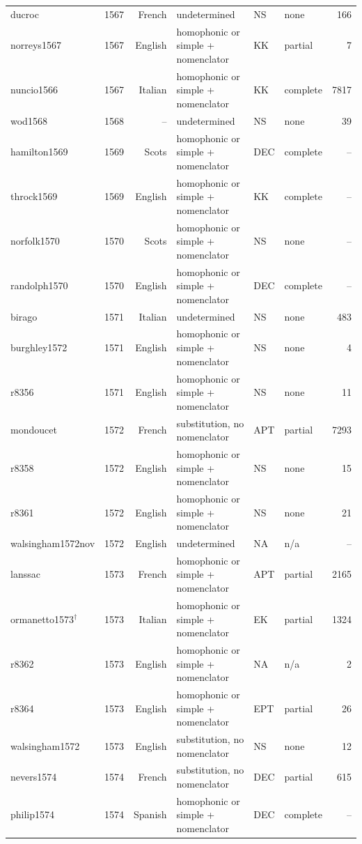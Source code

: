 {\begin{longtable}{@{}llrlllr@{}}
ducroc & 1567 & French & undetermined & NS & none & 166 \\
norreys1567 & 1567 & English & homophonic or simple + nomenclator & KK & partial & 7 \\
nuncio1566 & 1567 & Italian & homophonic or simple + nomenclator & KK & complete & 7817 \\
wod1568 & 1568 & -- & undetermined & NS & none & 39 \\
hamilton1569 & 1569 & Scots & homophonic or simple + nomenclator & DEC & complete & -- \\
throck1569 & 1569 & English & homophonic or simple + nomenclator & KK & complete & -- \\
norfolk1570 & 1570 & Scots & homophonic or simple + nomenclator & NS & none & -- \\
randolph1570 & 1570 & English & homophonic or simple + nomenclator & DEC & complete & -- \\
birago & 1571 & Italian & undetermined & NS & none & 483 \\
burghley1572 & 1571 & English & homophonic or simple + nomenclator & NS & none & 4 \\
r8356 & 1571 & English & homophonic or simple + nomenclator & NS & none & 11 \\
mondoucet & 1572 & French & substitution, no nomenclator & APT & partial & 7293 \\
r8358 & 1572 & English & homophonic or simple + nomenclator & NS & none & 15 \\
r8361 & 1572 & English & homophonic or simple + nomenclator & NS & none & 21 \\
walsingham1572nov & 1572 & English & undetermined & NA & n/a & -- \\
lanssac & 1573 & French & homophonic or simple + nomenclator & APT & partial & 2165 \\
ormanetto1573$^\dagger$ & 1573 & Italian & homophonic or simple + nomenclator & EK & partial & 1324 \\
r8362 & 1573 & English & homophonic or simple + nomenclator & NA & n/a & 2 \\
r8364 & 1573 & English & homophonic or simple + nomenclator & EPT & partial & 26 \\
walsingham1572 & 1573 & English & substitution, no nomenclator & NS & none & 12 \\
nevers1574 & 1574 & French & substitution, no nomenclator & DEC & partial & 615 \\
philip1574 & 1574 & Spanish & homophonic or simple + nomenclator & DEC & complete & -- \\

\end{longtable}}
